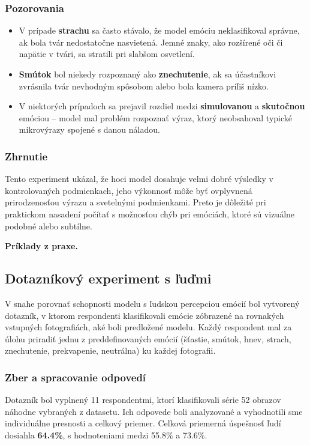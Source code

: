 \subsubsection{Pozorovania}
\begin{itemize}
    \item V pr\'ipade \textbf{strachu} sa \v{c}asto st\'avalo, \v{z}e model em\'ociu neklasifikoval spr\'avne, ak bola tv\'ar nedostato\v{c}ne nasvieten\'a. Jemn\'e znaky, ako roz\v{s}\'iren\'e o\v{c}i \v{c}i nap\"atie v tv\'ari, sa stratili pri slab\v{s}om osvetlen\'i.
    \item \textbf{Sm\'utok} bol niekedy rozpoznan\'y ako \textbf{znechutenie}, ak sa \'u\v{c}astn\'ikovi zvr\'asnila tv\'ar nevhodn\'ym sp\^osobom alebo bola kamera pr\'i\v{l}i\v{s} n\'izko.
    \item V niektor\'ych pr\'ipadoch sa prejavil rozdiel medzi \textbf{simulovanou} a \textbf{skuto\v{c}nou} em\'ociou -- model mal probl\'em rozpozna\v{t}  v\'yraz, ktor\'y neobsahoval typick\'e mikrov\'yrazy spojen\'e s danou n\'aladou.
\end{itemize}

\subsubsection{Zhrnutie}
Tento experiment uk\'azal, \v{z}e hoci model dosahuje velmi dobr\'e v\'ysledky v kontrolovan\'ych podmienkach, jeho v\'ykonnos\v{t} m\^o\v{z}e by\v{t} ovplyvnen\'a prirodzenos\v{t}ou v\'yrazu a sveteln\'ymi podmienkami. Preto je d\^ole\v{z}it\'e pri praktickom nasaden\'i po\v{c}\'ita\v{t} s mo\v{z}nos\v{t}ou ch\'yb pri em\'oci\'ach, ktor\'e s\'u vizu\'alne podobn\'e alebo subt\'ilne.

\textbf{Príklady z praxe.}

\subsection{Dotazn\'ikov\'y experiment s \v{l}u\v{d}mi}

V snahe porovna\v{t} schopnosti modelu s \v{l}udskou percepciou em\'oci\'i bol vytvoren\'y dotazn\'ik, v ktorom respondenti klasifikovali em\'ocie z\'obrazen\'e na rovnak\'ych vstupn\'ych fotografi\'ach, ak\'e boli predlo\v{z}en\'e modelu. Ka\v{z}d\'y respondent mal za \'ulohu priradi\v{t} jednu z preddefinovan\'ych em\'oci\'i (\v{s}\v{t}astie, sm\'utok, hnev, strach, znechutenie, prekvapenie, neutr\'alna) ku ka\v{z}dej fotografii.

\subsubsection{Zber a spracovanie odpoved\'i}
Dotazn\'ik bol vyplnen\'y 11 respondentmi, ktor\'i klasifikovali s\'erie 52 obrazov náhodne vybraných z datasetu. Ich odpovede boli analyzovan\'e a vyhodnotili sme individu\'alne presnosti a celkov\'y priemer. Celkov\'a priemern\'a \'uspe\v{s}nos\v{t} \v{l}ud\'i dosiahla \textbf{64.4\%}, s hodnoteniami medzi 55.8\% a 73.6\%.

